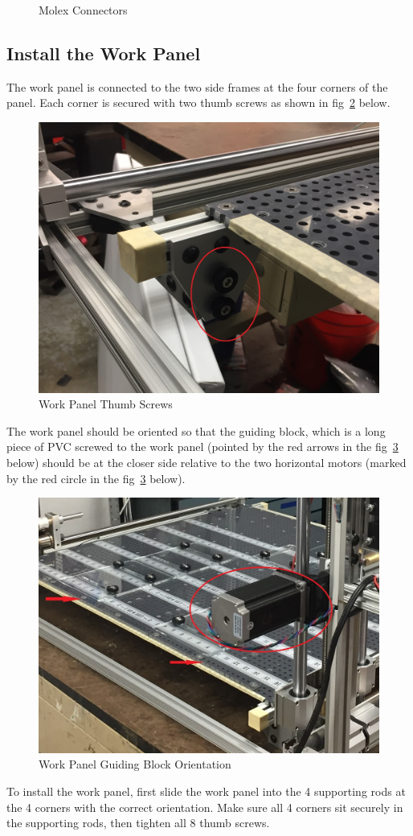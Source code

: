 \documentclass[titlepage,12pt,letter]{report}
\numberwithin{equation}{chapter}
\begin{document}
\begin{figure}[H]
\begin{minipage}[b]{0.3 \linewidth}
	\end{minipage}
	\caption{Molex Connectors}
	\label{fig:molex}
\end{figure}

\subsection{Install the Work Panel}
The work panel is connected to the two side frames at the four corners of the panel. Each corner is secured with two thumb screws as shown in fig~\ref{fig:panel} below. 
\begin{figure} [H]
	\includegraphics[width = 0.8\linewidth]{./Figures/panel_thumb_screw.jpg}
	\caption{Work Panel Thumb Screws}
	\label{fig:panel}
\end{figure}
The work panel should be oriented so that the guiding block, which is a long piece of PVC screwed to the work panel (pointed by the red arrows in the fig~\ref{fig:panel2} below) should be at the closer side relative to the two horizontal motors (marked by the red circle in the fig~\ref{fig:panel2} below).
\begin{figure} [H]
	\includegraphics[width = 0.8\linewidth]{./Figures/panel.jpg}
	\caption{Work Panel Guiding Block Orientation }
	\label{fig:panel2}
\end{figure}
To install the work panel, first slide the work panel into the 4 supporting rods at the 4 corners with the correct orientation. Make sure all 4 corners sit securely in the supporting rods, then tighten all 8 thumb screws.
\end{document}
